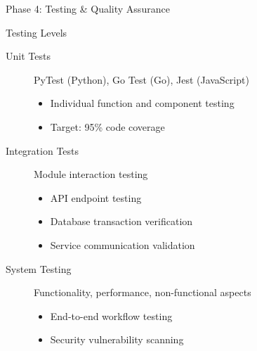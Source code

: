 \begin{frame}{Phase 4: Testing \& Quality Assurance}
    \begin{block}{Testing Levels}
        \begin{description}
            \item[Unit Tests] PyTest (Python), Go Test (Go), Jest (JavaScript)
            \begin{itemize}
                \item Individual function and component testing
                \item Target: 95\% code coverage
            \end{itemize}
            
            \item[Integration Tests] Module interaction testing
            \begin{itemize}
                \item API endpoint testing
                \item Database transaction verification
                \item Service communication validation
            \end{itemize}
            
            \item[System Testing] Functionality, performance, non-functional aspects
            \begin{itemize}
                \item End-to-end workflow testing
                \item Security vulnerability scanning
            \end{itemize}
        \end{description}
    \end{block}
\end{frame}

